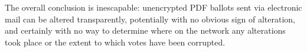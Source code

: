 \documentclass{article}
\begin{document}
The overall conclusion is inescapable: unencrypted PDF ballots sent
via electronic mail can be altered transparently, potentially with no
obvious sign of alteration, and certainly with no way to determine
where on the network any alterations took place or the extent to which
votes have been corrupted.










% 
\end{document}
